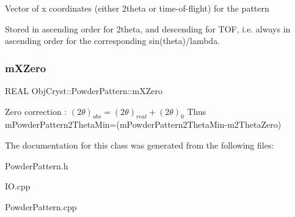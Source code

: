 Vector of x coordinates (either 2theta or time-\/of-\/flight) for the pattern

Stored in ascending order for 2theta, and descending for T\+OF, i.\+e. always in ascending order for the corresponding sin(theta)/lambda. \mbox{\label{class_obj_cryst_1_1_powder_pattern_ae4722ceea4440d27a7de6115f70705ab}} 
\subsubsection{\texorpdfstring{mXZero}{mXZero}}
{\footnotesize\ttfamily R\+E\+AL Obj\+Cryst\+::\+Powder\+Pattern\+::m\+X\+Zero\hspace{0.3cm}{\ttfamily [protected]}}

Zero correction \+: $ (2\theta)_{obs} = (2\theta)_{real} +(2\theta)_{0}$ Thus m\+Powder\+Pattern2\+Theta\+Min=(m\+Powder\+Pattern2\+Theta\+Min-\/m2\+Theta\+Zero) 

The documentation for this class was generated from the following files\+:\begin{DoxyCompactItemize}
\item 
Powder\+Pattern.\+h\item 
I\+O.\+cpp\item 
Powder\+Pattern.\+cpp\end{DoxyCompactItemize}
